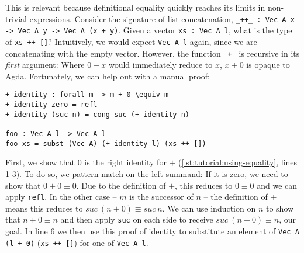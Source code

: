 This is relevant because definitional equality quickly reaches its limits in non-trivial expressions. Consider the signature of list concatenation, \texttt{\_++\_ : Vec A x -> Vec A y -> Vec A (x + y)}. Given a vector \texttt{xs : Vec A l}, what is the type of \texttt{xs ++ []}? Intuitively, we would expect \texttt{Vec A l} again, since we are concatenating with the empty vector. However, the function \texttt{\_+\_} is recursive in its \emph{first} argument: Where $0 + x$ would immediately reduce to $x$, $x + 0$ is opaque to Agda. Fortunately, we can help out with a manual proof:

\begin{lstlisting}[caption={Leveraging equality},label={lst:tutorial:using-equality},emph={identity,subst,foo}]
+-identity : forall m -> m + 0 \equiv m
+-identity zero = refl
+-identity (suc n) = cong suc (+-identity n)

foo : Vec A l -> Vec A l
foo xs = subst (Vec A) (+-identity l) (xs ++ [])
\end{lstlisting}

First, we show that $0$ is the right identity for $+$ (\autoref{lst:tutorial:using-equality}, lines 1-3). To do so, we pattern match on the left summand: If it is zero, we need to show that $0 + 0 \equiv 0$. Due to the definition of $+$, this reduces to $0 \equiv 0$ and we can apply \texttt{refl}. In the other case -- $m$ is the successor of $n$ -- the definition of $+$ means this reduces to $suc~(n + 0) \equiv suc~n$. We can use induction on $n$ to show that $n + 0 \equiv n$ and then apply \texttt{suc} on each side to receive $suc~(n + 0) \equiv n$, our goal. In line 6 we then use this proof of identity to substitute an element of \texttt{Vec A (l + 0)} (\texttt{xs ++ []}) for one of \texttt{Vec A l}.